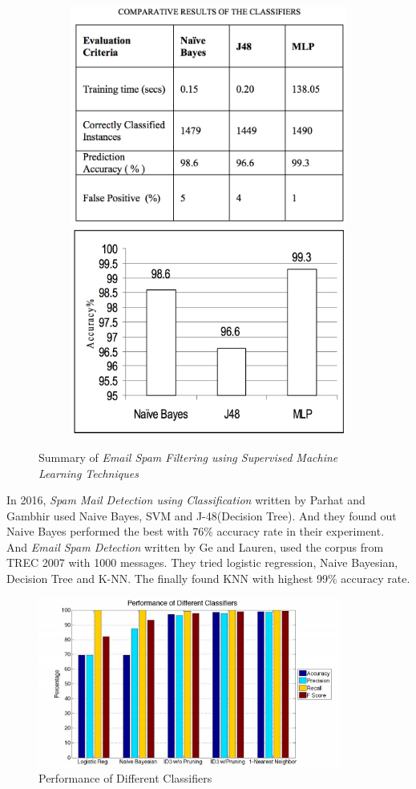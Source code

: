 \begin{figure}[H]
	\begin{subfigure}{\textwidth}
		\centering
		\includegraphics[width=.4\linewidth]{2010-1.png}
		\includegraphics[width=.4\linewidth]{2010-2.png}
	\end{subfigure}%
	\caption{Summary of \textit{Email Spam Filtering using Supervised Machine Learning Techniques}}
	\label{paper_summary_2010}
\end{figure}



In 2016, \textit{Spam Mail Detection using Classification} written by Parhat and Gambhir used Naive Bayes, SVM and J-48(Decision Tree). And they found out Naive Bayes performed the best with 76\% accuracy rate in their experiment. \\ 
And \textit{Email Spam Detection} written by Ge and  Lauren, used the corpus from TREC 2007 with 1000 messages. They tried logistic regression, Naive Bayesian, Decision Tree and K-NN. The finally found KNN with highest 99\% accuracy rate. \\

\begin{figure}[H]
	\centering
	\includegraphics[width=10cm]{2016.png}
	\caption{Performance of Different Classifiers}
	\label{paper_summary_2016}
\end{figure}


